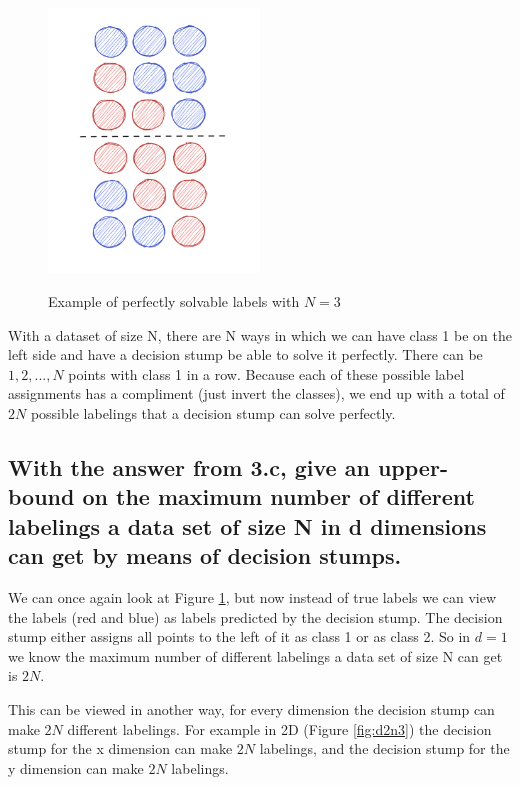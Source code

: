 \documentclass[11pt,a4paper]{article}
\begin{document}
\begin{figure}[h]
    \caption{Example of perfectly solvable labels with $N=3$}
    \centering
    \includegraphics[width=0.5\textwidth]{d1n3_possibilities.png}
    \label{fig:d1n3}
\end{figure}

With a dataset of size N, there are N ways in which we can have class 1 be on the left side and have a decision stump be able to solve it perfectly. There can be $1, 2, ..., N$ points with class 1 in a row.
Because each of these possible label assignments has a compliment (just invert the classes), we end up with a total of $2N$ possible labelings that a decision stump can solve perfectly.


\subsection{With the answer from 3.c, give an upper-bound on the maximum number of different
labelings a data set of size N in d dimensions can get by means of decision stumps.}
\label{sec:2d}

We can once again look at Figure \ref{fig:d1n3}, but now instead of true labels we can view the labels (red and blue) as labels predicted by the decision stump. The decision stump either assigns all points to the left of it as class 1 or as class 2. So in $d=1$ we know the maximum number of different labelings a data set of size N can get is $2N$. 

This can be viewed in another way, for every dimension the decision stump can make $2N$ different labelings. For example in 2D (Figure \ref{fig:d2n3}) the decision stump for the x dimension can make $2N$ labelings, and the decision stump for the y dimension can make $2N$ labelings.
\end{document}
